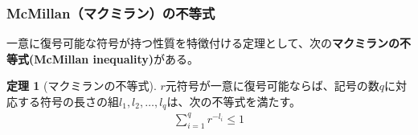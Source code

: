 \documentclass[uplatex,dvipdfmx,b5j,10pt]{jsbook}
\theoremstyle{definition}
\newtheorem{theorem}{定理}
\begin{document}
\subsubsection{McMillan（マクミラン）の不等式}

一意に復号可能な符号が持つ性質を特徴付ける定理として、次の\textbf{マクミランの不等式(McMillan inequality)}がある。

\begin{theorem}[マクミランの不等式] \label{mcmillan_ineqality}
  $r$元符号が一意に復号可能ならば、記号の数$q$に対応する符号の長さの組$l_{1}, l_{2}, \dots, l_{q}$は、次の不等式を満たす。
  \begin{eqnarray}
    \sum_{i = 1}^{q} r^{-l_{i}} \leq 1
  \end{eqnarray}
\end{theorem}
\end{document}
